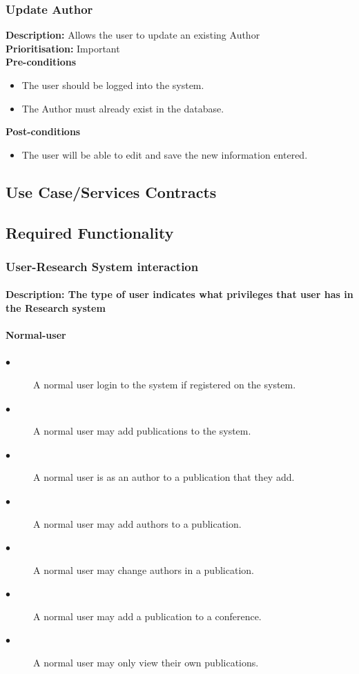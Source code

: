 \documentclass[a4paper]{article}
\begin{document}
	\subsubsection{Update Author}
	\textbf{Description:} Allows the user to update an existing Author\\
	\textbf{Prioritisation:} Important\\
	
	\textbf{Pre-conditions}
	 \begin{itemize}
		\item The user should be logged into the system.
		\item The Author must already exist in the database.
	\end{itemize}
	
	\textbf{Post-conditions}
	 \begin{itemize}
		\item The user will be able to edit and save the new information entered.
	\end{itemize}
    
    \pagebreak
	\subsection{Use Case/Services Contracts}
	
	\subsection{Required Functionality}
	\subsubsection{User-Research System interaction}
	\paragraph{\textbf{Description:} The type of user indicates what privileges that user has in the Research system}
	\paragraph{\textbf{Normal-user}}
	\begin{description}
		\item[$\bullet$] A normal user login to the system if registered on the system.
		\item[$\bullet$] A normal user may add publications to the system.
		\item[$\bullet$] A normal user is as an author to a publication that they add.
		\item[$\bullet$] A normal user may add authors to a publication.
		\item[$\bullet$] A normal user may change authors in a publication.
		\item[$\bullet$] A normal user may add a publication to a conference.
		\item[$\bullet$] A normal user may only view their own publications.
	\end{description}
\end{document}
